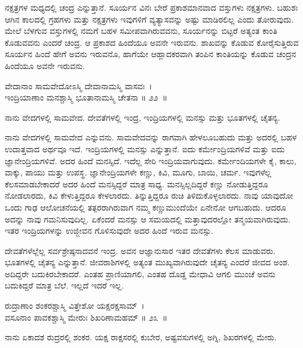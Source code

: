 ನಕ್ಷತ್ರಗಳ ಮಧ್ಯದಲ್ಲಿ ಚಂದ್ರ ಎನ್ನುತ್ತಾನೆ. ಸೂರ್ಯನ ವಿನಃ ಬೇರೆ ಪ್ರಕಾಶಮಾನವಾದ ವಸ್ತುಗಳು ನಕ್ಷತ್ರಗಳು. ಬಹುಶಃ ಆಗಿನ ಕಾಲದಲ್ಲಿ ಗ್ರಹಗಳು ಮತ್ತು ನಕ್ಷತ್ರಗಳು ಇವುಗಳಿಗೆ ವ್ಯತ್ಯಾಸವನ್ನು ಅಷ್ಟು ಮಾಡಿರಲಿಲ್ಲ ಎಂದು ತೋರುವುದು. ಮೇಲೆ ಬೆಳಗುವ ವಸ್ತುಗಳಲ್ಲಿ ನಮಗೆ ಬಹಳ ಸಮೀಪವಾಗಿರುವವನು, ಸೂರ್ಯನನ್ನು ಬಿಟ್ಟರೆ ಅತ್ಯಂತ ಕಾಂತಿ ಕೊಡುವವನು ಎಂದರೆ ಚಂದ್ರ. ಆ ಪ್ರಕಾಶದ ಹಿಂದೆಯೂ ಅವನೇ ಇರುವನು. ಶಾಖವನ್ನು ಕೊಡುವ ಕೋರೈಸುತ್ತಿರುವ ಸೂರ್ಯನ ಹಿಂದೆ ಹೇಗೆ ಅವನು ಇರುವನೊ, ಹಾಗೆಯೇ ಆಹ್ಲಾದಕರವಾಗಿ ತಂಪಿನ ಕಾಂತಿಯನ್ನು ಕೊಡುವ ಚಂದ್ರನ ಹಿಂದೆಯೂ ಅವನೇ ಇರುವನು.

\begin{shloka}
ವೇದಾನಾಂ ಸಾಮವೇದೋಽಸ್ಮಿ ದೇವಾನಾಮಸ್ಮಿ ವಾಸವಃ~।\\ಇಂದ್ರಿಯಾಣಾಂ ಮನಶ್ಚಾಸ್ಮಿ ಭೂತಾನಾಮಸ್ಮಿ ಚೇತನಾ \hfill॥ ೨೨~॥
\end{shloka}

\begin{artha}
ನಾನು ವೇದಗಳಲ್ಲಿ ಸಾಮವೇದ. ದೇವತೆಗಳಲ್ಲಿ ಇಂದ್ರ, ಇಂದ್ರಿಯಗಳಲ್ಲಿ ಮನಸ್ಸು ಮತ್ತು ಭೂತಗಳಲ್ಲಿ ಚೈತನ್ಯ.
\end{artha}

ನಾನು ವೇದಗಳಲ್ಲಿ ಸಾಮವೇದ ಎನ್ನುವನು. ಸಾಮವೇದವನ್ನು ರಾಗವಾಗಿ ಹೇಳಲೂಬಹುದು ಮತ್ತು ಅದರಲ್ಲಿ ಬಹಳ ಉದಾತ್ತವಾದ ಅರ್ಥವೂ ಇದೆ. ಇಂದ್ರಿಯಗಳಲ್ಲಿ ಮನಸ್ಸು ಎನ್ನುತ್ತಾನೆ. ಐದು ಕರ್ಮೇಂದ್ರಿಯಗಳಿವೆ ಮತ್ತು ಐದು ಜ್ಞಾನೇಂದ್ರಿಯಗಳಿವೆ. ಅದರ ಹಿಂದೆ ಮನಸ್ಸಿದೆ. ಇದೆಲ್ಲ ಸೇರಿ ಇಂದ್ರಿಯವಾಗುವುದು. ಕರ್ಮೇಂದಿಯಗಳೇ ಕೈ, ಕಾಲು, ವಾಕ್ಕು, ಪಾಯು ಮತ್ತು ಉಪಸ್ಥ. ಜ್ಞಾನೇಂದ್ರಿಯಗಳೇ ಕಣ್ಣು, ಕಿವಿ, ಮೂಗು, ಬಾಯಿ, ಚರ್ಮ. ಇವುಗಳೆಲ್ಲ ಕೆಲಸಮಾಡಬೇಕಾದರೆ ಅದರ ಹಿಂದೆ ಮನಸ್ಸಿದ್ದರೆ ಮಾತ್ರ ಸಾಧ್ಯ. ಮನಸ್ಸಿಲ್ಲದಿದ್ದರೆ ಕಣ್ಣು ನೋಡುತ್ತಿದ್ದರೂ ನೋಡಲಾರದು, ಕಿವಿ ಕೇಳುತ್ತಿದ್ದರೂ ಕೇಳಲಾರದು. ತಿನ್ನುತ್ತಿದ್ದರೂ ರುಚಿ ತಿಳಿದುಕೊಳ್ಳಲಾರದು. ನಾವು ಯಾವುದೋ ಒಂದು ಗಾಢ ಆಲೋಚನೆಯಲ್ಲಿ ತತ್ಪರರಾಗಿರುವಾಗ ನಮ್ಮ ಕಣ್ಣುಮುಂದೆಯೇ ಏನೇನೋ ಆಗಬಹುದು. ಆದರೂ ಅದನ್ನು ನಾವು ಗಮನಿಸುವುದಿಲ್ಲ. ಏಕೆಂದರೆ ಮನಸ್ಸು ಆ ಸಮಯದಲ್ಲಿ ಮತ್ತಾವುದರಲ್ಲೋ ತನ್ಮಯವಾಗಿರುವುದು. ಇತರ ಇಂದ್ರಿಯಗಳನ್ನು ಉಜ್ಜೀವನ ಗೊಳಿಸುವುದೇ ಅದರ ಹಿಂದೆ ಇರುವ ಮನಸ್ಸು.

ದೇವತೆಗಳೆಲ್ಲೆಲ್ಲ ಸರ್ವಶ್ರೇಷ್ಠನಾದವನೆ ಇಂದ್ರ. ಅವನ ಆಜ್ಞಾನುಸಾರ ಇತರ ದೇವತೆಗಳು ಕೆಲಸ ಮಾಡುವರು. ಭೂತಗಳಲ್ಲಿ ಚೈತನ್ಯ ಎನ್ನುತ್ತಾನೆ. ಜೀವರಾಶಿಗಳಲ್ಲಿ ಅತ್ಯಂತ ಮುಖ್ಯವಾಗಿರುವುದೇ ಚೈತನ್ಯ ಎಂದರೆ ಜೀವದ ಅಂಶ. ಅದಿದ್ದರೇ ಬದುಕಿರಬೇಕಾದರೆ. ಎಂತಹ ಪ್ರಾಣಿಯಾಗಲಿ, ಎಂತಹ ದೊಡ್ಡ ಮೇಧಾವಿ ಆಗಲಿ ಮುಂಚೆ ಅವನು ಬದುಕಿದ್ದರೆ ಮಾತ್ರ ಬೆಲೆ. ಇಲ್ಲದೆ ಇದರೆ ಇಲ್ಲ.

\begin{shloka}
ರುದ್ರಾಣಾಂ ಶಂಕರಶ್ಚಾಸ್ಮಿ ವಿತ್ತೇಶೋ ಯಕ್ಷರಕ್ಷಸಾಮ್~।\\ವಸೂನಾಂ ಪಾವಕಶ್ಚಾಸ್ಮಿ ಮೇರುಃ ಶಿಖರಿಣಾಮಹಮ್ \hfill॥ ೨೩~॥
\end{shloka}

\begin{artha}
ನಾನು ಏಕಾದಶ ರುದ್ರರಲ್ಲಿ ಶಂಕರ. ಯಕ್ಷ ರಾಕ್ಷಸರಲ್ಲಿ ಕುಬೇರ, ಅಷ್ಟವಸುಗಳಲ್ಲಿ ಅಗ್ನಿ, ಶಿಖರಗಳಲ್ಲಿ ಮೇರು.
\end{artha}

